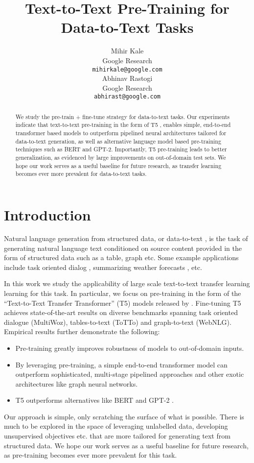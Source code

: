 \documentclass[11pt,a4paper]{article}
\title{\textbf{Text-to-Text Pre-Training for Data-to-Text Tasks}}
\author{Mihir Kale \\
  Google Research\\
  \texttt{mihirkale@google.com} \\\And
  Abhinav Rastogi \\
  Google Research \\
  \texttt{abhirast@google.com} \\}
\date{}
\begin{document}
\maketitle
\begin{abstract}
We study the pre-train + fine-tune strategy for data-to-text tasks. Our experiments indicate that text-to-text pre-training in the form of T5 \cite{raffel2019exploring}, enables simple, end-to-end transformer based models to outperform pipelined neural architectures tailored for data-to-text generation, as well as alternative language model based pre-training techniques such as BERT and GPT-2. Importantly, T5 pre-training leads to better generalization, as evidenced by large improvements on out-of-domain test sets. We hope our work serves as a useful baseline for future research, as transfer learning becomes ever more prevalent for data-to-text tasks.
\end{abstract}

\section{Introduction}
Natural language generation from structured data, or data-to-text \cite{kukich1983design,mckeown1985text}, is the task of generating natural language text conditioned on source content provided in the form of structured data such as a table, graph etc. Some example applications include task oriented dialog \cite{wen2015semantically}, summarizing weather forecasts \cite{sripada2003sumtime, goldberg1994using},  etc.

In this work we study the applicability of large scale text-to-text transfer learning learning for this task. In particular, we focus on pre-training in the form of the “Text-to-Text Transfer Transformer” (T5) models released by \citet{raffel2019exploring}. Fine-tuning T5 achieves state-of-the-art results on  diverse benchmarks spanning 
task oriented dialogue (MultiWoz),
tables-to-text (ToTTo) and graph-to-text (WebNLG). Empirical results further demonstrate the following:
\begin{itemize}
    \item Pre-training greatly improves robustness of models to out-of-domain inputs.
    \item By leveraging pre-training, a simple end-to-end transformer model can outperform sophisticated, multi-stage pipelined approaches and other exotic architectures like graph neural networks.
    \item T5 outperforms alternatives like BERT \cite{devlin2018bert} and GPT-2 \cite{radford2019language}.
\end{itemize}
\par Our approach is simple, only scratching the surface of what is possible. There is much to be explored in the space of leveraging unlabelled data, developing unsupervised objectives etc. that are more tailored for generating text from structured data. We hope our work serves as a useful baseline for future research, as pre-training becomes ever more prevalent for this task. 
\end{document}
